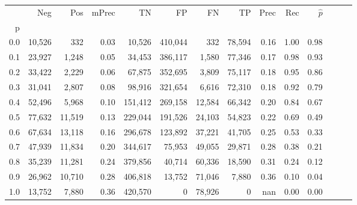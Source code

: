 \begin{tabular}{rrrrrrrrrrrrrr}
\toprule
{} &     Neg &     Pos & mPrec &       TN &       FP &      FN &      TP &  Prec &   Rec & $\hat{p}$ \\
p   &         &         &       &          &          &         &         &       &       &           \\
\midrule
0.0 &  10,526 &     332 &  0.03 &   10,526 &  410,044 &     332 &  78,594 &  0.16 &  1.00 &      0.98 \\
0.1 &  23,927 &   1,248 &  0.05 &   34,453 &  386,117 &   1,580 &  77,346 &  0.17 &  0.98 &      0.93 \\
0.2 &  33,422 &   2,229 &  0.06 &   67,875 &  352,695 &   3,809 &  75,117 &  0.18 &  0.95 &      0.86 \\
0.3 &  31,041 &   2,807 &  0.08 &   98,916 &  321,654 &   6,616 &  72,310 &  0.18 &  0.92 &      0.79 \\
0.4 &  52,496 &   5,968 &  0.10 &  151,412 &  269,158 &  12,584 &  66,342 &  0.20 &  0.84 &      0.67 \\
0.5 &  77,632 &  11,519 &  0.13 &  229,044 &  191,526 &  24,103 &  54,823 &  0.22 &  0.69 &      0.49 \\
0.6 &  67,634 &  13,118 &  0.16 &  296,678 &  123,892 &  37,221 &  41,705 &  0.25 &  0.53 &      0.33 \\
0.7 &  47,939 &  11,834 &  0.20 &  344,617 &   75,953 &  49,055 &  29,871 &  0.28 &  0.38 &      0.21 \\
0.8 &  35,239 &  11,281 &  0.24 &  379,856 &   40,714 &  60,336 &  18,590 &  0.31 &  0.24 &      0.12 \\
0.9 &  26,962 &  10,710 &  0.28 &  406,818 &   13,752 &  71,046 &   7,880 &  0.36 &  0.10 &      0.04 \\
1.0 &  13,752 &   7,880 &  0.36 &  420,570 &        0 &  78,926 &       0 &   nan &  0.00 &      0.00 \\
\bottomrule
\end{tabular}

